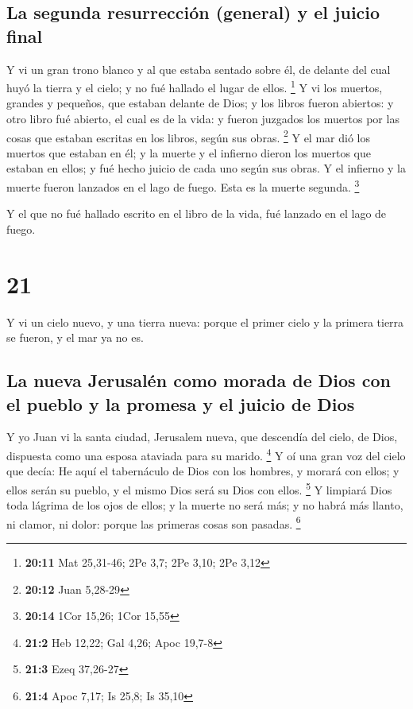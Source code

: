 \hypertarget{la-segunda-resurrecciuxf3n-general-y-el-juicio-final}{%
\subsection{La segunda resurrección (general) y el juicio
final}\label{la-segunda-resurrecciuxf3n-general-y-el-juicio-final}}

 Y vi un gran trono blanco y al que estaba sentado sobre
él, de delante del cual huyó la tierra y el cielo; y no fué hallado el
lugar de ellos. \footnote{\textbf{20:11} Mat 25,31-46; 2Pe 3,7; 2Pe
  3,10; 2Pe 3,12}  Y vi los muertos, grandes y pequeños,
que estaban delante de Dios; y los libros fueron abiertos: y otro libro
fué abierto, el cual es de la vida: y fueron juzgados los muertos por
las cosas que estaban escritas en los libros, según sus obras.
\footnote{\textbf{20:12} Juan 5,28-29}  Y el mar dió los
muertos que estaban en él; y la muerte y el infierno dieron los muertos
que estaban en ellos; y fué hecho juicio de cada uno según sus obras.
 Y el infierno y la muerte fueron lanzados en el lago de
fuego. Esta es la muerte segunda. \footnote{\textbf{20:14} 1Cor 15,26;
  1Cor 15,55}

 Y el que no fué hallado escrito en el libro de la vida,
fué lanzado en el lago de fuego.

\hypertarget{section-20}{%
\section{21}\label{section-20}}

 Y vi un cielo nuevo, y una tierra nueva: porque el primer
cielo y la primera tierra se fueron, y el mar ya no es.

\hypertarget{la-nueva-jerusaluxe9n-como-morada-de-dios-con-el-pueblo-y-la-promesa-y-el-juicio-de-dios}{%
\subsection{La nueva Jerusalén como morada de Dios con el pueblo y la
promesa y el juicio de
Dios}\label{la-nueva-jerusaluxe9n-como-morada-de-dios-con-el-pueblo-y-la-promesa-y-el-juicio-de-dios}}

 Y yo Juan vi la santa ciudad, Jerusalem nueva, que
descendía del cielo, de Dios, dispuesta como una esposa ataviada para su
marido. \footnote{\textbf{21:2} Heb 12,22; Gal 4,26; Apoc 19,7-8}
 Y oí una gran voz del cielo que decía: He aquí el
tabernáculo de Dios con los hombres, y morará con ellos; y ellos serán
su pueblo, y el mismo Dios será su Dios con ellos. \footnote{\textbf{21:3}
  Ezeq 37,26-27}  Y limpiará Dios toda lágrima de los ojos
de ellos; y la muerte no será más; y no habrá más llanto, ni clamor, ni
dolor: porque las primeras cosas son pasadas. \footnote{\textbf{21:4}
  Apoc 7,17; Is 25,8; Is 35,10}

